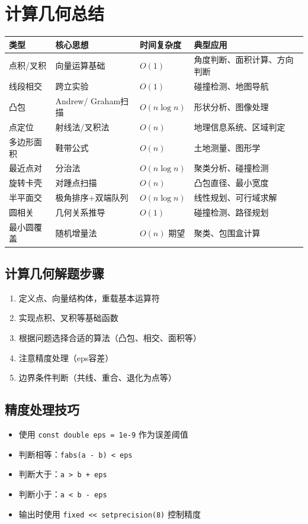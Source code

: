 \documentclass[12pt,a4paper]{ctexart}
\begin{document}
		\newpage
		
		\section{计算几何总结}
		\begin{table}[h]
			\centering
			\begin{tabularx}{\textwidth}{|l|p{3.5cm}|l|X|}
				\hline
				类型 & 核心思想 & 时间复杂度 & 典型应用 \\
				\hline
				点积/叉积 & 向量运算基础 & \(O(1)\) & 角度判断、面积计算、方向判断 \\
				\hline
				线段相交 & 跨立实验 & \(O(1)\) & 碰撞检测、地图导航 \\
				\hline
				凸包 & Andrew/ Graham扫描 & \(O(n\log n)\) & 形状分析、图像处理 \\
				\hline
				点定位 & 射线法/叉积法 & \(O(n)\) & 地理信息系统、区域判定 \\
				\hline
				多边形面积 & 鞋带公式 & \(O(n)\) & 土地测量、图形学 \\
				\hline
				最近点对 & 分治法 & \(O(n\log n)\) & 聚类分析、碰撞检测 \\
				\hline
				旋转卡壳 & 对踵点扫描 & \(O(n)\) & 凸包直径、最小宽度 \\
				\hline
				半平面交 & 极角排序+双端队列 & \(O(n\log n)\) & 线性规划、可行域求解 \\
				\hline
				圆相关 & 几何关系推导 & \(O(1)\) & 碰撞检测、路径规划 \\
				\hline
				最小圆覆盖 & 随机增量法 & \(O(n)\) 期望 & 聚类、包围盒计算 \\
				\hline
			\end{tabularx}
		\end{table}
		
		\subsection*{计算几何解题步骤}
		\begin{enumerate}
			\item 定义点、向量结构体，重载基本运算符
			\item 实现点积、叉积等基础函数
			\item 根据问题选择合适的算法（凸包、相交、面积等）
			\item 注意精度处理（eps容差）
			\item 边界条件判断（共线、重合、退化为点等）
		\end{enumerate}
		
		\subsection*{精度处理技巧}
		\begin{itemize}
			\item 使用 \texttt{const double eps = 1e-9} 作为误差阈值
			\item 判断相等：\texttt{fabs(a - b) < eps}
			\item 判断大于：\texttt{a > b + eps}
			\item 判断小于：\texttt{a < b - eps}
			\item 输出时使用 \texttt{fixed << setprecision(8)} 控制精度
		\end{itemize}
		
\end{document}
